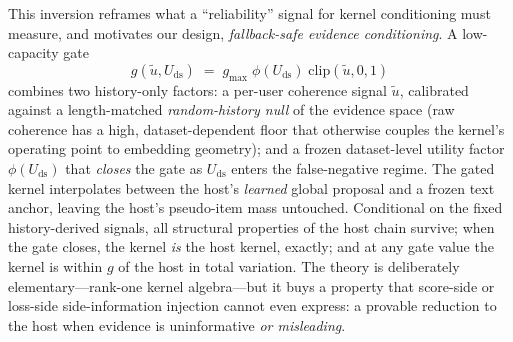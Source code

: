 \documentclass[letterpaper]{article}
\newcommand{\ut}{\tilde{u}}
\newcommand{\Uds}{U_{\mathrm{ds}}}
\newcommand{\phids}{\phi(\Uds)}
\begin{document}
This inversion reframes what a ``reliability'' signal for kernel
conditioning must measure, and motivates our design,
\emph{fallback-safe evidence conditioning}. A low-capacity gate
\begin{equation*}
  g(\ut,\Uds) \;=\; g_{\max}\;\phids\;\mathrm{clip}(\ut,0,1)
\end{equation*}
combines two history-only factors: a per-user coherence signal $\ut$,
calibrated against a length-matched \emph{random-history null} of the
evidence space (raw coherence has a high, dataset-dependent floor that
otherwise couples the kernel's operating point to embedding geometry);
and a frozen dataset-level utility factor $\phids$ that \emph{closes}
the gate as $\Uds$ enters the false-negative regime. The gated kernel
interpolates between the host's \emph{learned} global proposal and a
frozen text anchor, leaving the host's pseudo-item mass untouched.
Conditional on the fixed history-derived signals, all structural
properties of the host chain survive; when the gate closes, the kernel
\emph{is} the host kernel, exactly; and at any gate value the kernel is
within $g$ of the host in total variation. The theory is deliberately
elementary---rank-one kernel algebra---but it buys a property that
score-side or loss-side side-information injection cannot even express:
a provable reduction to the host when evidence is uninformative
\emph{or misleading}.
\end{document}
